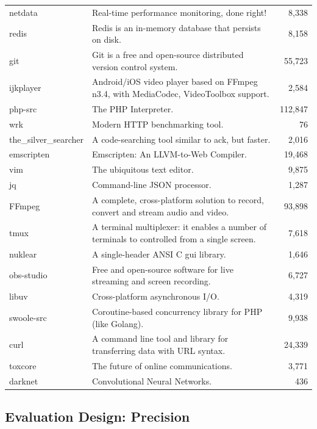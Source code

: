 \begin{table}[htbp]
{\begin{tabular}{@{}lp{13cm}r@{}}
netdata & Real-time performance monitoring, done right! & 8,338 \\
redis & Redis is an in-memory database that persists on disk. & 8,158 \\
git & Git is a free and open-source distributed version control system. & 55,723 \\
ijkplayer & Android/iOS video player based on FFmpeg n3.4, with MediaCodec, VideoToolbox support. & 2,584 \\
php-src & The PHP Interpreter. & 112,847 \\
wrk & Modern HTTP benchmarking tool. & 76 \\
the\_silver\_searcher & A code-searching tool similar to ack, but faster. & 2,016 \\
emscripten & Emscripten: An LLVM-to-Web Compiler. & 19,468 \\
vim & The ubiquitous text editor. & 9,875 \\
jq & Command-line JSON processor. & 1,287 \\
FFmpeg & A complete, cross-platform solution to record, convert and stream audio and video. & 93,898 \\
tmux & A terminal multiplexer: it enables a number of terminals to controlled from a single screen.  & 7,618 \\
nuklear & A single-header ANSI C gui library. & 1,646 \\
obs-studio & Free and open-source software for live streaming and screen recording. & 6,727 \\
libuv & Cross-platform asynchronous I/O. & 4,319 \\
swoole-src & Coroutine-based concurrency library for PHP (like Golang). & 9,938 \\
curl & A command line tool and library for transferring data with URL syntax. & 24,339 \\
toxcore & The future of online communications. & 3,771 \\
darknet & Convolutional Neural Networks. & 436 \\
\bottomrule
\end{tabular}
}
\end{table}




\subsection{Evaluation Design: Precision}
\label{sec:eval:js:c:precision}


